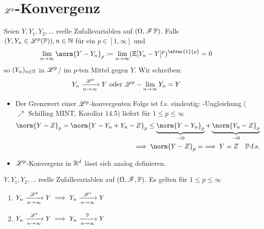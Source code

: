 \section{$\Ln{p}$-Konvergenz}
\begin{definition}[$\Ln{p}$-Konvergenz]
	Seien $Y,Y_1,Y_2, \dots$ reelle Zufallsvariablen auf $(\Omega,\mathscr F\,\mathbb{P})$. Falls $(Y,Y_n \in \mathscr{L}^{p}(\mathbb{P})), n\in \mathbb{N}$ für ein $p \in [1,\infty]$ und
	\begin{align*}
		\lim_{n \to \infty} \norm{Y-Y_n}_p := \lim_{n \to \infty} 
		(\E[Y_n - Y]^p)^{\sfrac{1}{p}} = 0
	\end{align*}
	so  $(Y_n)_{n \in \mathbb{N}}$ in $\Ln{p}$/ im $p$-ten Mittel gegen $Y$. Wir schreiben:
	\begin{align*}
		Y_n \xrightarrow[n \to \infty]{\mathscr{L}^{p}} Y \text{ oder } \mathscr{L}^{p}-\lim_{n \to \infty} Y_n = Y
	\end{align*}
\end{definition}
\begin{*remark}
	\begin{itemize}
		\item Der Grenzwert einer $\Ln{p}$-konvergenten Folge ist f.s. eindeutig: -Ungleichung ($\nearrow$ Schilling MINT, Korollar 14.5) liefert für $1 \le p \le \infty$
		\begin{align*}
			\norm{Y-Z}_p = \norm{Y-Y_n+Y_n - Z}_p \le \underbrace{\norm{Y-Y_n}_p}_{\to 0} + 
			\underbrace{\norm{Y_n-Z}_p}_{\to 0}\\
			\implies \norm{Y-Z}_p = \implies Y=Z \quad \P\text{-f.s.}
		\end{align*}
		\item $\Ln{p}$-Konvergenz in $\mathbb{R}^d$ lässt sich analog definieren.
	\end{itemize}
\end{*remark}
\begin{lemma}
	$Y,Y_1,Y_2,\dots$ reelle Zufallsvariablen auf $(\Omega,\mathscr F,\mathbb{P})$. Es gelten für $1 \le p \le \infty$
	\begin{enumerate}
		\item $Y_n \xrightarrow[n \to \infty]{\mathscr{L}^{p}} Y \implies Y_n \xrightarrow[n \to \infty]{\mathscr{L}^{1}} Y$
		\item $Y_n \xrightarrow[n \to \infty]{\mathscr{L}^{1}} Y\implies Y_n \xrightarrow[n \to \infty]{\mathbb{P}} Y$
	\end{enumerate}
\end{lemma}
